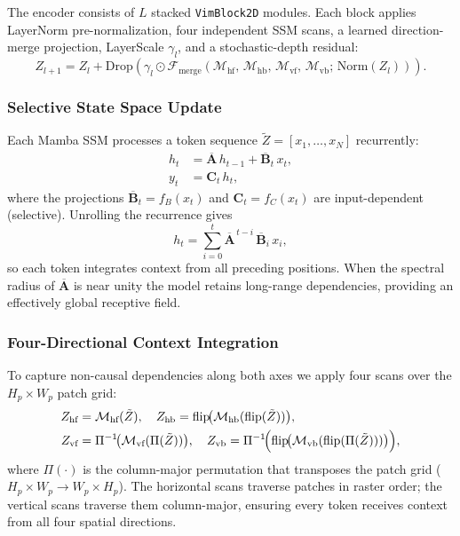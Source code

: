 \documentclass[runningheads]{llncs}
\begin{document}
The encoder consists of $L$ stacked \texttt{VimBlock2D} modules. Each block
applies LayerNorm pre-normalization, four independent SSM scans, a learned
direction-merge projection, LayerScale $\gamma_l$, and a stochastic-depth
residual:
\begin{equation}
  Z_{l+1} = Z_l + \text{Drop}\!\left(
      \gamma_l \odot
      \mathcal{F}_{\text{merge}}\!\left(
          \mathcal{M}_{\text{hf}},\,
          \mathcal{M}_{\text{hb}},\,
          \mathcal{M}_{\text{vf}},\,
          \mathcal{M}_{\text{vb}};\,
          \text{Norm}(Z_l)
      \right)
  \right).
\end{equation}

\subsubsection{Selective State Space Update}

Each Mamba SSM processes a token sequence
$\tilde{Z} = [x_1, \dots, x_N]$ recurrently:
\begin{align}
  h_t &= \overline{\mathbf{A}}\, h_{t-1} + \overline{\mathbf{B}}_t\, x_t, \\
  y_t &= \mathbf{C}_t\, h_t,
\end{align}
where the projections $\overline{\mathbf{B}}_t = f_B(x_t)$ and
$\mathbf{C}_t = f_C(x_t)$ are input-dependent (selective). Unrolling
the recurrence gives
\begin{equation}
  h_t = \sum_{i=0}^{t} \overline{\mathbf{A}}^{\,t-i}\,
        \overline{\mathbf{B}}_i\, x_i,
\end{equation}
so each token integrates context from all preceding positions. When the
spectral radius of $\overline{\mathbf{A}}$ is near unity the model retains
long-range dependencies, providing an effectively global receptive field.

\subsubsection{Four-Directional Context Integration}

To capture non-causal dependencies along both axes we apply four scans over
the $H_p \times W_p$ patch grid:
\begin{align}
  Z_{\text{hf}} &= \mathcal{M}_{\text{hf}}(\tilde{Z}),
  \quad Z_{\text{hb}} = \operatorname{flip}\!\bigl(
      \mathcal{M}_{\text{hb}}(\operatorname{flip}(\tilde{Z}))\bigr), \\
  Z_{\text{vf}} &= \Pi^{-1}\!\bigl(\mathcal{M}_{\text{vf}}(\Pi(\tilde{Z}))\bigr),
  \quad Z_{\text{vb}} = \Pi^{-1}\!\Bigl(\operatorname{flip}\!\bigl(
      \mathcal{M}_{\text{vb}}(\operatorname{flip}(\Pi(\tilde{Z})))\bigr)\Bigr),
\end{align}
where $\Pi(\cdot)$ is the column-major permutation that transposes the patch
grid ($H_p \times W_p \to W_p \times H_p$). The horizontal scans traverse
patches in raster order; the vertical scans traverse them column-major,
ensuring every token receives context from all four spatial directions.
\end{document}
